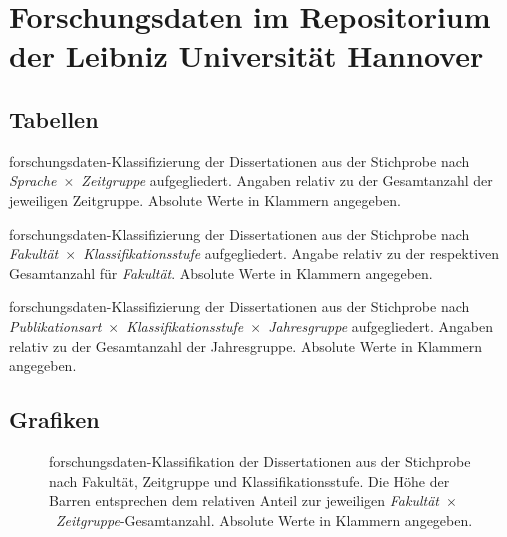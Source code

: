 \chapter{Forschungsdaten im Repositorium der Leibniz Universität Hannover}
\section{Tabellen}
\begin{table}[!htbp]
	\caption{\gls{forschungsdaten}-Klassifizierung der Dissertationen aus der Stichprobe nach \textit{Sprache}~$\times$~\textit{Zeitgruppe} aufgegliedert.
    Angaben relativ zu der Gesamtanzahl der jeweiligen Zeitgruppe.
    Absolute Werte in Klammern angegeben.}
    
    \label{tab:luh-repo-sprache-zeitgruppe}
\end{table}

\begin{table}[!htbp]
	\caption{\gls{forschungsdaten}-Klassifizierung der Dissertationen aus der Stichprobe nach \textit{Fakultät}~$\times$~\textit{Klassifikationsstufe} aufgegliedert.
    Angabe relativ zu der respektiven Gesamtanzahl für \textit{Fakultät}.
    Absolute Werte in Klammern angegeben.}
    
    \label{tab:luh-repo-classification-general-all-faculty}
\end{table}
\pagebreak
\begin{table}[!htbp]
	\caption{\gls{forschungsdaten}-Klassifizierung der Dissertationen aus der Stichprobe nach \textit{Publikationsart}~$\times$~\textit{Klassifikationsstufe}~$\times$~\textit{Jahresgruppe} aufgegliedert.
    Angaben relativ zu der Gesamtanzahl der Jahresgruppe.
    Absolute Werte in Klammern angegeben.}
    
    \label{tab:luh-repo-classification-general-publication}
\end{table}
\pagebreak

\section{Grafiken}
\begin{figure}[!htbp]
    \resizebox{\ifdim\width>\textwidth\textwidth\else\width\fi}{!}{}
    \caption{\gls{forschungsdaten}-Klassifikation der Dissertationen aus der Stichprobe nach Fakultät, Zeitgruppe und Klassifikationsstufe.
    Die Höhe der Barren entsprechen dem relativen Anteil zur jeweiligen \textit{Fakultät}~$\times$~\textit{Zeitgruppe}-Gesamtanzahl.
    Absolute Werte in Klammern angegeben.}
    \label{fig:luh-repo-faculty-yeargroup-classification}
    \end{figure}

